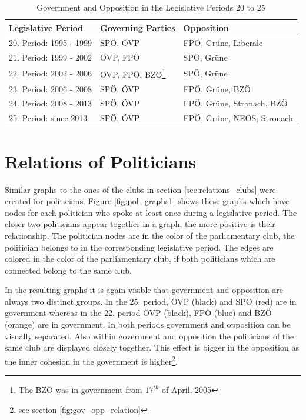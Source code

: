 \begin{table}

\centering
\bgroup
\def\arraystretch{1.2}
\begin{tabular}{| p{4cm} | p{3cm} | l |}
\hline
  Legislative Period & Governing Parties & Opposition  \\
\hline
\hline
  20. Period: 1995 - 1999 & SPÖ, ÖVP & FPÖ, Grüne, Liberale \\
\hline
  21. Period: 1999 - 2002 & ÖVP, FPÖ & SPÖ, Grüne \\
\hline
  22. Period: 2002 - 2006 & ÖVP, FPÖ, BZÖ\footnote{The BZÖ was in government from $17^{th}$ of April, 2005} & SPÖ, Grüne \\
\hline
  23. Period: 2006 - 2008 & SPÖ, ÖVP & FPÖ, Grüne, BZÖ \\
\hline
  24. Period: 2008 - 2013 & SPÖ, ÖVP & FPÖ, Grüne, Stronach, BZÖ \\
\hline
  25. Period: since 2013 & SPÖ, ÖVP & FPÖ, Grüne, NEOS, Stronach \\
\hline

\end{tabular}
\egroup
\caption{Government and Opposition in the Legislative Periods 20 to 25}
\label{table:gov_opp_parties}
\end{table}


\section{Relations of Politicians}
\label{sec:relations_pol}
Similar graphs to the ones of the clubs in section \ref{sec:relations_clubs} were created for politicians. Figure \ref{fig:pol_graphs1} shows these graphs which have nodes for each politician who spoke at least once during a legislative period. The closer two politicians appear together in a graph, the more positive is their relationship. The politician nodes are in the color of the parliamentary club, the politician belongs to in the corresponding legislative period. The edges are colored in the color of the parliamentary club, if both politicians which are connected belong to the same club.

In the resulting graphs it is again visible that government and opposition are always two distinct groups. In the 25. period, ÖVP (black) and SPÖ (red) are in government whereas in the 22. period ÖVP (black), FPÖ (blue) and BZÖ (orange) are in government. In both periods government and opposition can be visually separated. Also within government and opposition the politicians of the same club are displayed closely together. This effect is bigger in the opposition as the inner cohesion in the government is higher\footnote{see section \ref{fig:gov_opp_relation}}.

